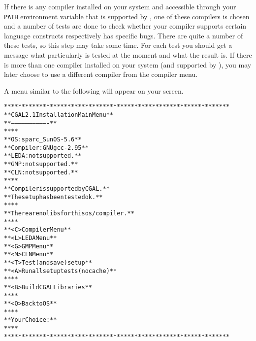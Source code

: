 If there is any compiler installed on your system and accessible
through your \texttt{PATH} environment variable that is supported by
\cgal, one of these compilers is chosen and a number of tests are done
to check whether your compiler supports certain language constructs
respectively has specific bugs. There are quite a number of these
tests, so this step may take some time. For each test you should get a
message what particularly is tested at the moment and what the result
is. If there is more than one compiler installed on your system (and
supported by \cgal), you may later choose to use a different compiler
from the compiler menu.

A menu similar to the following will appear on your screen.

{\ccTexHtml{\scriptsize}{} \label{pic:main-menu}
\begin{alltt}
  ****************************************************************
  **              CGAL 2.1 Installation Main Menu               **
  **              -------------------------------               **
  **                                                            **
  **   OS:                  sparc_SunOS-5.6                     **
  **   Compiler:            GNU gcc-2.95                        **
  **   LEDA:                not supported.                      **
  **   GMP:                 not supported.                      **
  **   CLN:                 not supported.                      **
  **                                                            **
  **   Compiler is supported by CGAL.                           **
  **   The setup has been tested ok.                            **
  **                                                            **
  **   There are no libs for this os/compiler.                  **
  **                                                            **
  **   <C>  Compiler Menu                                       **
  **   <L>  LEDA Menu                                           **
  **   <G>  GMP Menu                                            **
  **   <M>  CLN Menu                                            **
  **   <T>  Test (and save) setup                               **
  **   <A>  Run all setup tests (no cache)                      **
  **                                                            **
  **   <B>  Build CGAL Libraries                                **
  **                                                            **
  **   <Q>  Back to OS                                          **
  **                                                            **
  **   Your Choice:                                             **
  **                                                            **
  ****************************************************************
\end{alltt}}

